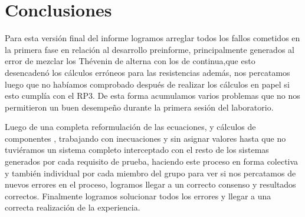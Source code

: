 \section{Conclusiones}
\RaggedRight

Para esta versión final del informe logramos arreglar todos los fallos cometidos en la primera fase en relación al desarrollo preinforme, principalmente generados al error de mezclar los Thévenin de alterna con los de continua,que esto desencadenó los cálculos erróneos para las resistencias además, nos percatamos luego que no habíamos comprobado después de realizar los cálculos en papel si esto cumplía con el RP3. De esta forma acumulamos varios problemas que no nos permitieron un buen desempeño durante la primera sesión del laboratorio.\\[0.3cm] \par
Luego de una completa reformulación de las ecuaciones, y cálculos de componentes , trabajando con inecuaciones y sin asignar valores hasta que no tuviéramos un sistema completo interceptado con el resto de los sistemas generados por cada requisito de prueba, haciendo este proceso en forma colectiva y también individual por cada miembro del grupo para ver si nos percatamos de nuevos errores en el proceso, logramos llegar a un correcto consenso y resultados correctos. 
Finalmente logramos solucionar todos los errores y llegar a una correcta realización de la experiencia.
